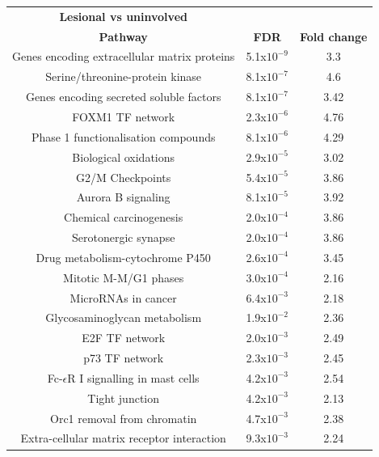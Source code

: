\begin{table}[t]
\renewcommand{\arraystretch}{0.7}
\centering
\begin{tabular}{@{}c c c}
\toprule
\textbf{Lesional vs uninvolved} & & \\
\textbf{Pathway} & \textbf{FDR} & \textbf{Fold change} \\
\midrule
Genes encoding extracellular matrix proteins & 5.1x$10^{-9}$ & 3.3 \\
Serine/threonine-protein kinase              & 8.1x$10^{-7}$  & 4.6 \\ 
Genes encoding secreted soluble factors      & 8.1x$10^{-7}$  & 3.42 \\ 
FOXM1 TF network                             & 2.3x$10^{-6}$  & 4.76 \\ 
Phase 1 functionalisation compounds          & 8.1x$10^{-6}$  & 4.29 \\ 
Biological oxidations 	                     & 2.9x$10^{-5}$  & 3.02 \\ 
G2/M Checkpoints                             & 5.4x$10^{-5}$  & 3.86 \\ 
Aurora B signaling                           & 8.1x$10^{-5}$  & 3.92 \\
Chemical carcinogenesis                      & 2.0x$10^{-4}$  & 3.86 \\ 
Serotonergic synapse                         & 2.0x$10^{-4}$  & 3.86 \\
Drug metabolism-cytochrome P450              & 2.6x$10^{-4}$  & 3.45 \\ 
Mitotic M-M/G1 phases                        & 3.0x$10^{-4}$  & 2.16 \\
MicroRNAs in cancer                          & 6.4x$10^{-3}$  & 2.18 \\
Glycosaminoglycan metabolism                 & 1.9x$10^{-2}$  & 2.36 \\ 
E2F TF network                               & 2.0x$10^{-3}$  & 2.49 \\
p73 TF network                               & 2.3x$10^{-3}$  & 2.45 \\
Fc-$\epsilon$R I signalling in mast cells    & 4.2x$10^{-3}$  & 2.54 \\ 
Tight junction                               & 4.2x$10^{-3}$  & 2.13 \\
Orc1 removal from chromatin                  & 4.7x$10^{-3}$  & 2.38 \\
Extra-cellular matrix receptor interaction & 9.3x$10^{-3}$  & 2.24 \\

\end{tabular}
\end{table}
